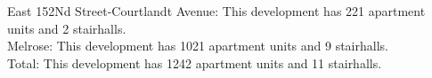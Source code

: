 {East 152Nd Street-Courtlandt Avenue}: This development has 221 apartment units and 2 stairhalls.\\{Melrose}: This development has 1021 apartment units and 9 stairhalls.\\{Total}: This development has 1242 apartment units and 11 stairhalls.\\